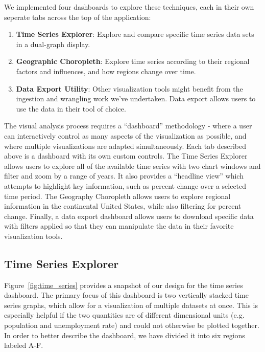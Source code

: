 \documentclass{sigchi}
\begin{document}
We implemented four dashboards to explore these techniques, each in their own seperate tabs across the top of the application:

\begin{enumerate}
    \item \textbf{Time Series Explorer}: Explore and compare specific time series data sets in a dual-graph display.
    \item \textbf{Geographic Choropleth}: Explore time series according to their regional factors and influences, and how regions change over time.
    \item \textbf{Data Export Utility}: Other visualization tools might benefit from the ingestion and wrangling work we've undertaken. Data export allows users to use the data in their tool of choice.
\end{enumerate}

The visual analysis process requires a ``dashboard'' methodology - where a user can interactively control as many aspects of the visualization as possible, and where multiple visualizations are adapted simultaneously. Each tab described above is a dashboard with its own custom controls. The Time Series Explorer allows users to explore all of the available time series with two chart windows and filter and zoom by a range of years. It also provides a ``headline view'' which attempts to highlight key information, such as percent change over a selected time period. The Geography Choropleth allows users to explore regional information in the continental United States, while also filtering for percent change. Finally, a data export dashboard allows users to download specific data with filters applied so that they can manipulate the data in their favorite visualization tools.

\subsection{Time Series Explorer}

Figure~\ref{fig:time_series} provides a snapshot of our design for the time series dashboard. The primary focus of this dashboard is two vertically stacked time series graphs, which allow for a visualization of multiple datasets at once. This is especially helpful if the two quantities are of different dimensional units (e.g. population and unemployment rate) and could not otherwise be plotted together. In order to better describe the dashboard, we have divided it into six regions labeled A-F.
\end{document}
